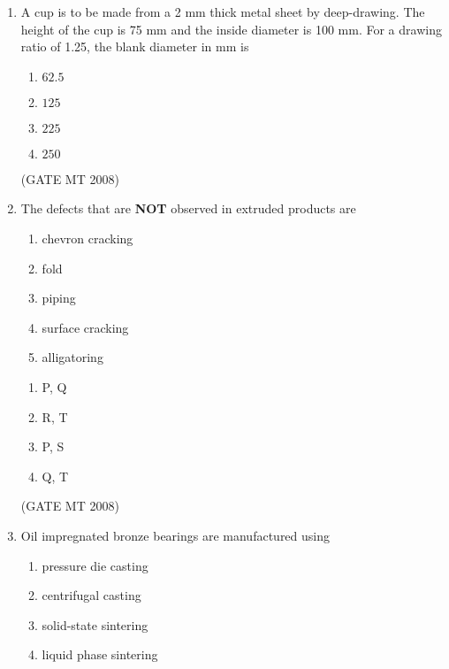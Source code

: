 \documentclass[11pt, letterpaper]{article}
\theoremstyle{remark}
\begin{document}
\begin{enumerate}
\begin{multicols}{2}
\begin{enumerate} 
\item P-3, Q-2, R-1, S-4
\item P-4, Q-3, R-2, S-1
\item P-1, Q-3, R-4, S-2
\item P-3, Q-2, R-4, S-1
\end{enumerate}
\end{multicols}
\hfill(GATE MT 2008)

\item A cup is to be made from a 2 mm thick metal sheet by deep-drawing. 
The height of the cup is 75 mm and the inside diameter is 100 mm. 
For a drawing ratio of 1.25, the blank diameter in mm is
\begin{multicols}{4}
\begin{enumerate} 
\item $62.5$
\item $125$
\item $225$
\item $250$
\end{enumerate}
\end{multicols}
\hfill(GATE MT 2008)

\item The defects that are \textbf{NOT} observed in extruded products are
\begin{enumerate}[label=(\MakeUppercase{\alph*}), start=16]
\item chevron cracking
\item fold
\item piping
\item surface cracking
\item alligatoring
\end{enumerate}

\begin{multicols}{2}
\begin{enumerate} 
\item P, Q
\item R, T
\item P, S
\item Q, T
\end{enumerate}
\end{multicols}
\hfill(GATE MT 2008)
\item Oil impregnated bronze bearings are manufactured using
\begin{multicols}{2}
\begin{enumerate} 
\item pressure die casting
\item centrifugal casting
\item solid-state sintering
\item liquid phase sintering
\end{enumerate}
\end{multicols}



\end{enumerate}
\end{document}
